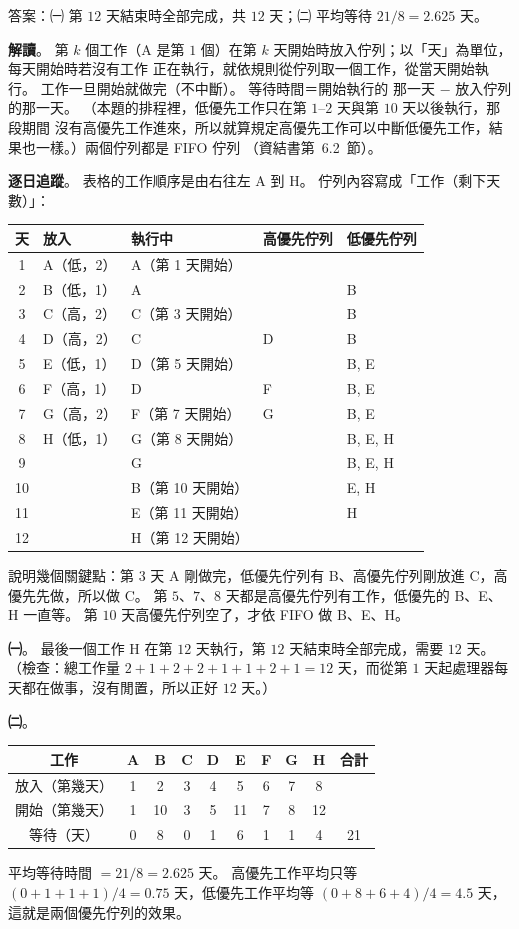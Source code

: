 \begin{pastsoln}
答案：㈠ 第 $12$ 天結束時全部完成，共 $12$ 天；㈡ 平均等待 $21/8 = 2.625$ 天。

\textbf{解讀}。 第 $k$ 個工作（A 是第 $1$ 個）在第 $k$ 天開始時放入佇列；以「天」為單位，每天開始時若沒有工作
正在執行，就依規則從佇列取一個工作，從當天開始執行。 工作一旦開始就做完（不中斷）。 等待時間＝開始執行的
那一天 $-$ 放入佇列的那一天。 （本題的排程裡，低優先工作只在第 $1$–$2$ 天與第 $10$ 天以後執行，那段期間
沒有高優先工作進來，所以就算規定高優先工作可以中斷低優先工作，結果也一樣。）兩個佇列都是 FIFO 佇列
（資結書第~6.2~節）。

\textbf{逐日追蹤}。 表格的工作順序是由右往左 A 到 H。 佇列內容寫成「工作（剩下天數）」：
\begin{center}
\small
\begin{tabular}{cllll}
\toprule
天 & 放入 & 執行中 & 高優先佇列 & 低優先佇列 \\
\midrule
1 & A（低，2） & A（第 1 天開始） & & \\
2 & B（低，1） & A & & B \\
3 & C（高，2） & C（第 3 天開始） & & B \\
4 & D（高，2） & C & D & B \\
5 & E（低，1） & D（第 5 天開始） & & B, E \\
6 & F（高，1） & D & F & B, E \\
7 & G（高，2） & F（第 7 天開始） & G & B, E \\
8 & H（低，1） & G（第 8 天開始） & & B, E, H \\
9 & & G & & B, E, H \\
10 & & B（第 10 天開始） & & E, H \\
11 & & E（第 11 天開始） & & H \\
12 & & H（第 12 天開始） & & \\
\bottomrule
\end{tabular}
\end{center}
說明幾個關鍵點：第 $3$ 天 A 剛做完，低優先佇列有 B、高優先佇列剛放進 C，高優先先做，所以做 C。 第 $5$、$7$、$8$
天都是高優先佇列有工作，低優先的 B、E、H 一直等。 第 $10$ 天高優先佇列空了，才依 FIFO 做 B、E、H。

\textbf{㈠}。 最後一個工作 H 在第 $12$ 天執行，第 $12$ 天結束時全部完成，需要 $12$ 天。 （檢查：總工作量
$2+1+2+2+1+1+2+1 = 12$ 天，而從第 $1$ 天起處理器每天都在做事，沒有閒置，所以正好 $12$ 天。）

\textbf{㈡}。
\begin{center}
\begin{tabular}{c*{8}{c}c}
\toprule
工作 & A & B & C & D & E & F & G & H & 合計 \\
\midrule
放入（第幾天） & 1 & 2 & 3 & 4 & 5 & 6 & 7 & 8 & \\
開始（第幾天） & 1 & 10 & 3 & 5 & 11 & 7 & 8 & 12 & \\
等待（天） & 0 & 8 & 0 & 1 & 6 & 1 & 1 & 4 & 21 \\
\bottomrule
\end{tabular}
\end{center}
平均等待時間 $= 21 / 8 = 2.625$ 天。 高優先工作平均只等 $(0+1+1+1)/4 = 0.75$ 天，低優先工作平均等
$(0+8+6+4)/4 = 4.5$ 天，這就是兩個優先佇列的效果。
\end{pastsoln}
